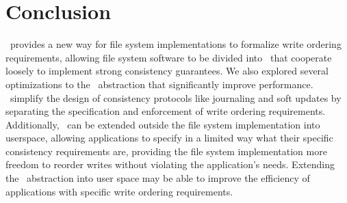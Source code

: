 \section{Conclusion}
\label{sec:conclusion}

\Kudos\ provides a new way for file system implementations to formalize
write ordering requirements, allowing file system software to be divided
into \modules\ that cooperate loosely to implement strong consistency
guarantees. We also explored several optimizations to the \patch\
abstraction that significantly improve performance.  \Patches\
simplify the design of consistency protocols like
journaling and soft updates by separating the specification and enforcement
of write ordering requirements. Additionally, \patches\ can be extended
outside the file system implementation into userspace, allowing
applications to specify in a limited way what their specific consistency
requirements are, providing the file system implementation more freedom to
reorder writes without violating the application's needs. 
Extending the \patch\ abstraction into user space may be able to improve
the efficiency of applications with specific write ordering requirements.
